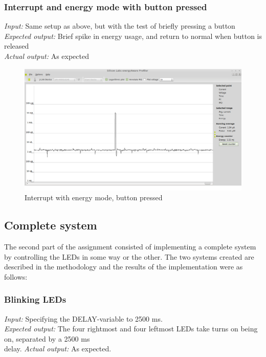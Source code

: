 	\subsubsection{Interrupt and energy mode with button pressed}
	\emph{Input: } Same setup as above, but with the test of briefly pressing a button \\
	\emph{Expected output: } Brief spike in energy usage, and return to normal when button is released \\
	\emph{Actual output: } As expected
	
	\begin{center}
		\begin{figure}[H]
			\includegraphics[width=\textwidth]{fig/interruptAndButton.png}	
			\caption{Interrupt with energy mode, button pressed }	
		\end{figure}
	\end{center}	
	
\subsection{Complete system}

The second part of the assignment consisted of implementing a complete system by controlling the LEDs in some way or the other. The two systems created are described in the methodology and the results of the implementation were as follows:

\subsubsection{Blinking LEDs}

\emph{Input: } Specifying the DELAY-variable to 2500 ms. \\
\emph{Expected output: } The four rightmost and four leftmost LEDs take turns on being on, separated by a 2500 ms \\ delay.
\emph{Actual output: } As expected. \\

